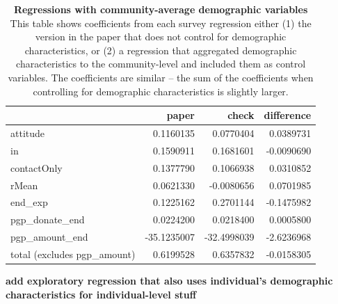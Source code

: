 \documentclass[
]{article}
\begin{document}
\begin{table}[H]
\begin{center}
\label{tab:comp_df1}
\caption{\textbf{Regressions with community-average demographic variables} This table shows coefficients from each survey regression either (1) the version in the paper that does not control for demographic characteristics, or (2) a regression that aggregated demographic characteristics to the community-level and included them as control variables. The coefficients are similar -- the sum of the coefficients when controlling for demographic characteristics is slightly larger.}
\smallskip

\begin{tabular}{l|r|r|r}
\hline
  & paper & check & difference\\
\hline
attitude & 0.1160135 & 0.0770404 & 0.0389731\\
\hline
in & 0.1590911 & 0.1681601 & -0.0090690\\
\hline
contactOnly & 0.1377790 & 0.1066938 & 0.0310852\\
\hline
rMean & 0.0621330 & -0.0080656 & 0.0701985\\
\hline
end\_exp & 0.1225162 & 0.2701144 & -0.1475982\\
\hline
pgp\_donate\_end & 0.0224200 & 0.0218400 & 0.0005800\\
\hline
pgp\_amount\_end & -35.1235007 & -32.4998039 & -2.6236968\\
\hline
total (excludes pgp\_amount) & 0.6199528 & 0.6357832 & -0.0158305\\
\hline
\end{tabular}


\end{center}
\end{table}

\textbf{add exploratory regression that also uses individual's
demographic characteristics for individual-level stuff}
\end{document}
